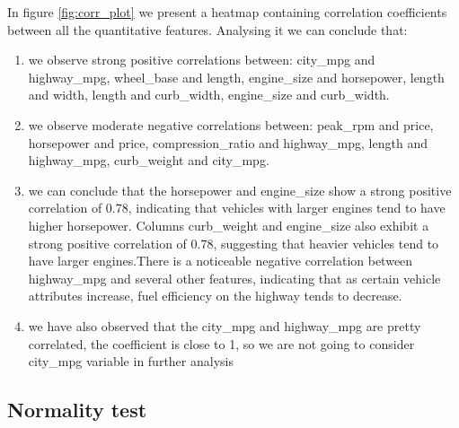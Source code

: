 \documentclass[11pt,a4paper]{article}\usepackage[]{graphicx}\usepackage[]{xcolor}
\begin{document}
	
	In figure \ref{fig:corr_plot} we present a heatmap containing correlation coefficients between all the quantitative features. Analysing it we can conclude that:
	\begin{enumerate}
	
\item we observe strong positive correlations between: city\_mpg and highway\_mpg, wheel\_base and length, engine\_size and horsepower, length and width, length and curb\_width, engine\_size and curb\_width.
\item we observe moderate negative correlations between: peak\_rpm and price, horsepower and price, compression\_ratio and highway\_mpg, length and highway\_mpg, curb\_weight and city\_mpg.
\item we can conclude that the horsepower and engine\_size show a strong positive correlation of 0.78, indicating that vehicles with larger engines tend to have higher horsepower. Columns curb\_weight and engine\_size also exhibit a strong positive correlation of 0.78, suggesting that heavier vehicles tend to have larger engines.There is a noticeable negative correlation between highway\_mpg and several other features, indicating that as certain vehicle attributes increase, fuel efficiency on the highway tends to decrease.
\item we have also observed that the city\_mpg and highway\_mpg are pretty correlated, the coefficient is close to 1, so we are not going to consider city\_mpg variable in further analysis
	\end{enumerate}
	
	\subsection{Normality test}
	
\end{document}

